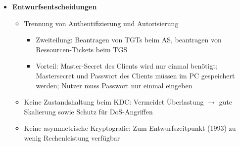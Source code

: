 \begin{itemize}
\begin{itemize}
	\end{itemize}
	\item \textbf{Entwurfsentscheidungen}
	\begin{itemize}
		\item Trennung von Authentifizierung und Autorisierung
		\begin{itemize}
			\item Zweiteilung: Beantragen von TGTs beim AS, beantragen von Ressourcen-Tickets beim TGS
			\item Vorteil: Master-Secret des Clients wird nur einmal benötigt; Mastersecret und Passwort des Clients müssen im PC gespeichert werden; Nutzer muss Passwort nur einmal eingeben
		\end{itemize}
		\item Keine Zustandshaltung beim KDC: Vermeidet Überlastung \(\rightarrow\) gute Skalierung sowie Schutz für DoS-Angriffen
		\item Keine asymmetrische Kryptografie: Zum Entwurfszeitpunkt (1993) zu wenig Rechenleistung verfügbar
	\end{itemize}
\end{itemize}


